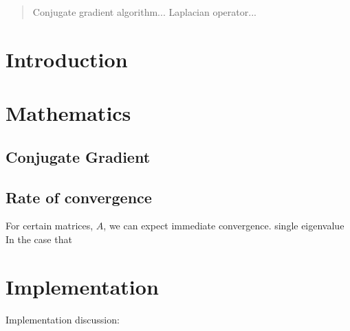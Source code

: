 \begin{abstract}
    Conjugate gradient algorithm... Laplacian operator...
\end{abstract}

\section{Introduction}

\iffalse
Interesting, cogent account of the work in this report
> in the context of the mathematical problem considered 
> in the scientific computing more widely
Very well referenced.

Talk about the problems we are going to discuss
> Laplacian operator. Finite difference of the finite difference of Laplace
> How do we get the matrix?
> Both for 1 and 2D.

Top 10 algorithms 20th century. How does it relate to wider mathematical community?

\fi


\section{Mathematics}

\iffalse
CG discussion:

Main algorithm
Mathematics of the mechanism
Preconditioning
Limitations of the algorithm
How do we get good/bad convergence?
Proof of convergence
Proof of complexity
\fi

\subsection{Conjugate Gradient}
\label{sec:cg}



\subsection{Rate of convergence}

For certain matrices, $A$, we can expect immediate convergence. single eigenvalue
In the case that 


\section{Implementation}

\iffalse
Implementation discussion:

